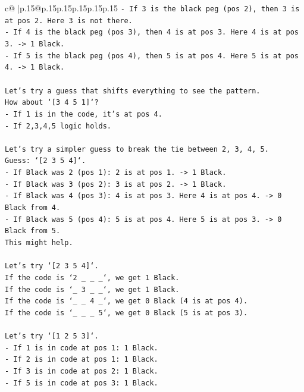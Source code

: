 \documentclass{article}
\begin{document}
{\begin{supertabular}{c@{$\;$}|p{.15\linewidth}@{}p{.15\linewidth}p{.15\linewidth}p{.15\linewidth}p{.15\linewidth}p{.15\linewidth}}
{{{\texttt{{-} If 3 is the black peg (pos 2), then 3 is at pos 2. Here 3 is not there.} \\
\texttt{{-} If 4 is the black peg (pos 3), then 4 is at pos 3. Here 4 is at pos 3. {-}> 1 Black.} \\
\texttt{{-} If 5 is the black peg (pos 4), then 5 is at pos 4. Here 5 is at pos 4. {-}> 1 Black.} \\
\\ 
\texttt{Let's try a guess that shifts everything to see the pattern.} \\
\texttt{How about `{[}3 4 5 1{]}`?} \\
\texttt{{-} If 1 is in the code, it's at pos 4.} \\
\texttt{{-} If 2,3,4,5 logic holds.} \\
\\ 
\texttt{Let's try a simpler guess to break the tie between 2, 3, 4, 5.} \\
\texttt{Guess: `{[}2 3 5 4{]}`.} \\
\texttt{{-} If Black was 2 (pos 1): 2 is at pos 1. {-}> 1 Black.} \\
\texttt{{-} If Black was 3 (pos 2): 3 is at pos 2. {-}> 1 Black.} \\
\texttt{{-} If Black was 4 (pos 3): 4 is at pos 3. Here 4 is at pos 4. {-}> 0 Black from 4.} \\
\texttt{{-} If Black was 5 (pos 4): 5 is at pos 4. Here 5 is at pos 3. {-}> 0 Black from 5.} \\
\texttt{This might help.} \\
\\ 
\texttt{Let's try `{[}2 3 5 4{]}`.} \\
\texttt{If the code is `2 \_ \_ \_`, we get 1 Black.} \\
\texttt{If the code is `\_ 3 \_ \_`, we get 1 Black.} \\
\texttt{If the code is `\_ \_ 4 \_`, we get 0 Black (4 is at pos 4).} \\
\texttt{If the code is `\_ \_ \_ 5`, we get 0 Black (5 is at pos 3).} \\
\\ 
\texttt{Let's try `{[}1 2 5 3{]}`.} \\
\texttt{{-} If 1 is in code at pos 1: 1 Black.} \\
\texttt{{-} If 2 is in code at pos 1: 1 Black.} \\
\texttt{{-} If 3 is in code at pos 2: 1 Black.} \\
\texttt{{-} If 5 is in code at pos 3: 1 Black.} \\
}}}
\end{supertabular}}
\end{document}

